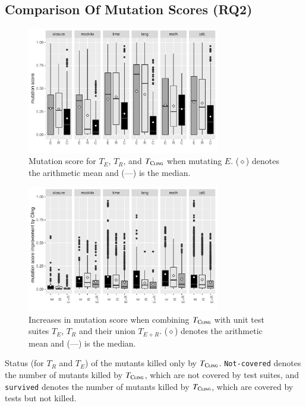 \subsection{Comparison Of Mutation Scores (RQ2)}
 
 
\begin{figure}[t]
    \centering
    \includegraphics[width=0.75\textwidth]{papers/cling/figures/mutation-coverage-boxplot.pdf}
    \caption{Mutation score for $T_E$, $T_R$, and $T_\textsc{Cling}$ when mutating $E$. ($\diamond$) denotes the arithmetic mean and (---) is the median.}
    \label{fig:mutation:boxplot}
\end{figure}

\begin{figure}[t]
    \centering
    \includegraphics[width=0.75\textwidth]{papers/cling/figures/mutation-diff-boxplot.pdf}
    \caption{Increases in mutation score when combining $T_\textsc{Cling}$ with unit test suites $T_E$, $T_R$ and their union $T_{E+R}$. ($\diamond$) denotes the arithmetic mean and (---) is the median.}
    \label{fig:mutation:diff:boxplot} 
\end{figure}

\begin{table} [t]
	\center
    \caption{Status (for $T_R$ and $T_E$) of the mutants killed only by $T_{\textsc{Cling}}$. \texttt{Not-covered} denotes the number of mutants killed by $T_{\textsc{Cling}}$, which are not covered by \evosuite test suites, and \texttt{survived} denotes the number of mutants killed by $T_{\textsc{Cling}}$, which are covered by \evosuite tests but not killed.}
	\label{tab:mutant-status-table}
	
\end{table} 



